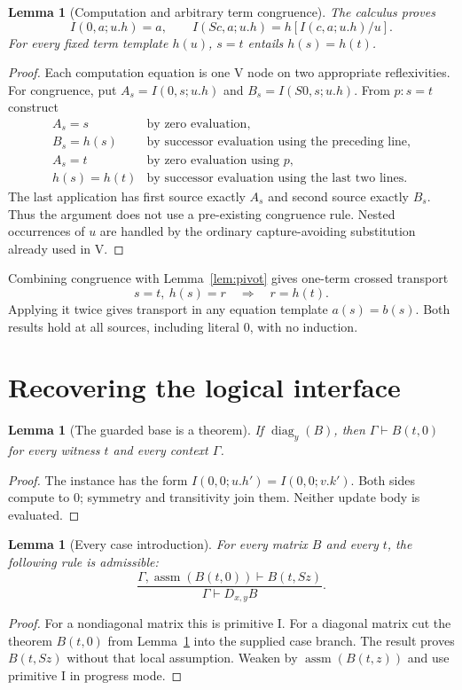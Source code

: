 \documentclass[11pt]{article}
\newtheorem{lemma}[theorem]{Lemma}
\theoremstyle{definition}\newtheorem{definition}[theorem]{Definition}
\theoremstyle{remark}\newtheorem{remark}[theorem]{Remark}
\newcommand{\assm}{\operatorname{assm}}
\newcommand{\diag}{\operatorname{diag}}
\begin{document}
\begin{lemma}[Computation and arbitrary term congruence]\label{lem:computation}
The calculus proves
\[
 I(0,a;u.h)=a,\qquad I(Sc,a;u.h)=h[I(c,a;u.h)/u].
\]
For every fixed term template $h(u)$, $s=t$ entails $h(s)=h(t)$.
\end{lemma}
\begin{proof}
Each computation equation is one V node on two appropriate reflexivities. For congruence, put $A_s=I(0,s;u.h)$ and $B_s=I(S0,s;u.h)$. From $p:s=t$ construct
\[
\begin{array}{rl}
 A_s=s&\text{by zero evaluation},\\
 B_s=h(s)&\text{by successor evaluation using the preceding line},\\
 A_s=t&\text{by zero evaluation using }p,\\
 h(s)=h(t)&\text{by successor evaluation using the last two lines}.
\end{array}
\]
The last application has first source exactly $A_s$ and second source exactly $B_s$. Thus the argument does not use a pre-existing congruence rule. Nested occurrences of $u$ are handled by the ordinary capture-avoiding substitution already used in V.
\end{proof}

Combining congruence with Lemma~\ref{lem:pivot} gives one-term crossed transport
\[
 s=t,\ h(s)=r\quad\Longrightarrow\quad r=h(t).
\]
Applying it twice gives transport in any equation template $a(s)=b(s)$. Both results hold at all sources, including literal $0$, with no induction.

\section{Recovering the logical interface}
\label{sec:logical}

\begin{lemma}[The guarded base is a theorem]\label{lem:base}
If $\diag_y(B)$, then $\Gamma\vdash B(t,0)$ for every witness $t$ and every context $\Gamma$.
\end{lemma}
\begin{proof}
The instance has the form $I(0,0;u.h')=I(0,0;v.k')$. Both sides compute to $0$; symmetry and transitivity join them. Neither update body is evaluated.
\end{proof}

\begin{lemma}[Every case introduction]\label{lem:casesintro}
For every matrix $B$ and every $t$, the following rule is admissible:
\[
 \frac{\Gamma,\assm(B(t,0))\vdash B(t,Sz)}
 {\Gamma\vdash D_{x,y}B}.
\]
\end{lemma}
\begin{proof}
For a nondiagonal matrix this is primitive I. For a diagonal matrix cut the theorem $B(t,0)$ from Lemma~\ref{lem:base} into the supplied case branch. The result proves $B(t,Sz)$ without that local assumption. Weaken by $\assm(B(t,z))$ and use primitive I in progress mode.
\end{proof}
\end{document}
